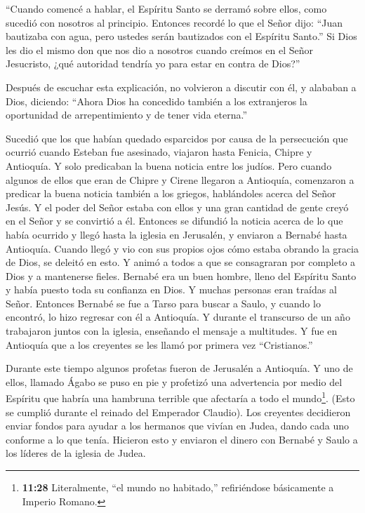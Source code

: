  ``Cuando comencé a hablar, el Espíritu Santo se derramó
sobre ellos, como sucedió con nosotros al principio. 
Entonces recordé lo que el Señor dijo: ``Juan bautizaba con agua, pero
ustedes serán bautizados con el Espíritu Santo.''  Si Dios
les dio el mismo don que nos dio a nosotros cuando creímos en el Señor
Jesucristo, ¿qué autoridad tendría yo para estar en contra de Dios?''

 Después de escuchar esta explicación, no volvieron a
discutir con él, y alababan a Dios, diciendo: ``Ahora Dios ha concedido
también a los extranjeros la oportunidad de arrepentimiento y de tener
vida eterna.''

 Sucedió que los que habían quedado esparcidos por causa de
la persecución que ocurrió cuando Esteban fue asesinado, viajaron hasta
Fenicia, Chipre y Antioquía. Y solo predicaban la buena noticia entre
los judíos.  Pero cuando algunos de ellos que eran de
Chipre y Cirene llegaron a Antioquía, comenzaron a predicar la buena
noticia también a los griegos, hablándoles acerca del Señor Jesús.
 Y el poder del Señor estaba con ellos y una gran cantidad
de gente creyó en el Señor y se convirtió a él.  Entonces
se difundió la noticia acerca de lo que había ocurrido y llegó hasta la
iglesia en Jerusalén, y enviaron a Bernabé hasta Antioquía.
 Cuando llegó y vio con sus propios ojos cómo estaba
obrando la gracia de Dios, se deleitó en esto. Y animó a todos a que se
consagraran por completo a Dios y a mantenerse fieles. 
Bernabé era un buen hombre, lleno del Espíritu Santo y había puesto toda
su confianza en Dios. Y muchas personas eran traídas al Señor.
 Entonces Bernabé se fue a Tarso para buscar a Saulo,
 y cuando lo encontró, lo hizo regresar con él a Antioquía.
Y durante el transcurso de un año trabajaron juntos con la iglesia,
enseñando el mensaje a multitudes. Y fue en Antioquía que a los
creyentes se les llamó por primera vez ``Cristianos.''

 Durante este tiempo algunos profetas fueron de Jerusalén a
Antioquía.  Y uno de ellos, llamado Ágabo se puso en pie y
profetizó una advertencia por medio del Espíritu que habría una hambruna
terrible que afectaría a todo el mundo\footnote{\textbf{11:28}
  Literalmente, ``el mundo no habitado,'' refiriéndose básicamente a
  Imperio Romano.}. (Esto se cumplió durante el reinado del Emperador
Claudio).  Los creyentes decidieron enviar fondos para
ayudar a los hermanos que vivían en Judea, dando cada uno conforme a lo
que tenía.  Hicieron esto y enviaron el dinero con Bernabé
y Saulo a los líderes de la iglesia de Judea.

